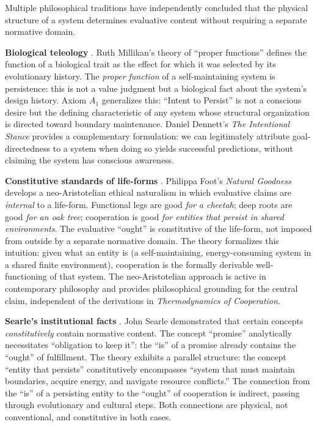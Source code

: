 \documentclass[11pt]{article}
\theoremstyle{plain}
\theoremstyle{definition}
\theoremstyle{remark}
\begin{document}
Multiple philosophical traditions have independently concluded that the
physical structure of a system determines evaluative content without
requiring a separate normative domain.

\textbf{Biological teleology} \citep{Millikan1984, Dennett1995}. Ruth
Millikan's theory of ``proper functions'' defines the function of a
biological trait as the effect for which it was selected by its
evolutionary history. The \emph{proper function} of a self-maintaining
system is persistence: this is not a value judgment but a biological
fact about the system's design history. Axiom \(A_1\) generalizes this:
``Intent to Persist'' is not a conscious desire but the defining
characteristic of any system whose structural organization is directed
toward boundary maintenance. Daniel Dennett's \emph{The Intentional
Stance} \citep{Dennett1987, Dennett1995} provides a complementary
formulation: we can legitimately attribute goal-directedness to a system
when doing so yields successful predictions, without claiming the system
has conscious awareness.

\textbf{Constitutive standards of life-forms}
\citep{Foot2001, Hursthouse1999}. Philippa Foot's \emph{Natural
Goodness} develops a neo-Aristotelian ethical naturalism in which
evaluative claims are \emph{internal} to a life-form. Functional legs
are good \emph{for a cheetah}; deep roots are good \emph{for an oak
tree}; cooperation is good \emph{for entities that persist in shared
environments}. The evaluative ``ought'' is constitutive of the
life-form, not imposed from outside by a separate normative domain. The
theory formalizes this intuition: given what an entity is (a
self-maintaining, energy-consuming system in a shared finite
environment), cooperation is the formally derivable well-functioning of
that system. The neo-Aristotelian approach is active in contemporary
philosophy \citep{Lutz2024} and provides philosophical grounding for the
central claim, independent of the derivations in \emph{Thermodynamics of
Cooperation}.

\textbf{Searle's institutional facts} \citep{Searle1964}. John Searle
demonstrated that certain concepts \emph{constitutively} contain
normative content. The concept ``promise'' analytically necessitates
``obligation to keep it'': the ``is'' of a promise already contains the
``ought'' of fulfillment. The theory exhibits a parallel structure: the
concept ``entity that persists'' constitutively encompasses ``system
that must maintain boundaries, acquire energy, and navigate resource
conflicts.'' The connection from the ``is'' of a persisting entity to
the ``ought'' of cooperation is indirect, passing through evolutionary
and cultural steps. Both connections are physical, not conventional, and
constitutive in both cases.
\end{document}
